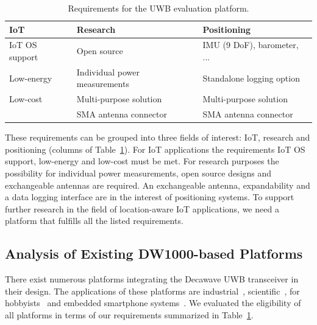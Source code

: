 \documentclass[journal,comsoc]{IEEEtran}
\begin{document}
\vspace*{0.5em}
\begin{table}[t!]
	\centering
	\begin{tabular}{  m{2.5cm}   m{2.5cm}   m{2.5cm}  }
	\hline
	\textbf{IoT} & \textbf{Research} & \textbf{Positioning} \\ \hline \hline
	IoT OS support & Open source & IMU (9 DoF), barometer, ... \\ \hline
	Low-energy & Individual power measurements & Standalone logging option \\ \hline
	Low-cost & Multi-purpose solution & Multi-purpose solution \\ \hline
	 & SMA antenna connector & SMA antenna connector \\ \hline
	\end{tabular}
	\caption{Requirements for the UWB evaluation platform.}
	\label{tab:requirements}
\end{table}
These requirements can be grouped into three fields of interest: IoT, research and positioning (columns of Table~\ref{tab:requirements}). 
For IoT applications the requirements IoT OS support, low-energy and low-cost must be met. 
For research purposes the possibility for individual power measurements, open source designs and exchangeable antennas are required. 
An exchangeable antenna, expandability and a data logging interface are in the interest of positioning systems. 
To support further research in the field of location-aware IoT applications, we need a platform that fulfills all the listed requirements. 

\subsection{Analysis of Existing DW1000-based Platforms}
\label{subsec:analysisuwbplatforms}

There exist numerous platforms integrating the Decawave UWB transceiver in their design.
The applications of these platforms are industrial~\cite{openrtlswebsite,sewiowebsite}, scientific~\cite{lab11website}, for hobbyists~\cite{pozyxwebsite} and embedded smartphone systems~\cite[SpoonPhone]{7891540}. 
We evaluated the eligibility of all platforms in terms of our requirements summarized in Table~\ref{tab:requirements}.
\end{document}
